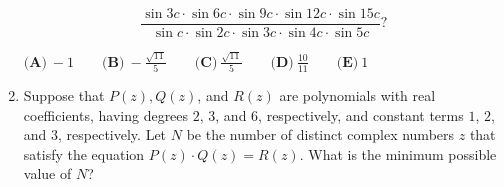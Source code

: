 \documentclass{article}
\begin{document}
\begin{enumerate}[label=\arabic*., itemsep=0.5em]
\begin{equation*}
\frac{\sin 3c \cdot \sin 6c \cdot \sin 9c \cdot \sin 12c \cdot \sin 15c}{\sin c \cdot \sin 2c \cdot \sin 3c \cdot \sin 4c \cdot \sin 5c}?
\end{equation*}


$\textbf{(A)}\ {-}1 \qquad\textbf{(B)}\ {-}\frac{\sqrt{11}}{5} \qquad\textbf{(C)}\ \frac{\sqrt{11}}{5} \qquad\textbf{(D)}\
\frac{10}{11} \qquad\textbf{(E)}\ 1$\par \vspace{0.5em}\item Suppose that $P(z), Q(z)$, and $R(z)$ are polynomials with real coefficients, having degrees $2$, $3$, and $6$, respectively, and constant terms $1$, $2$, and $3$, respectively. Let $N$ be the number of distinct complex numbers $z$ that satisfy the equation $P(z) \cdot Q(z)=R(z)$. What is the minimum possible value of $N$?


\end{enumerate}
\end{document}
